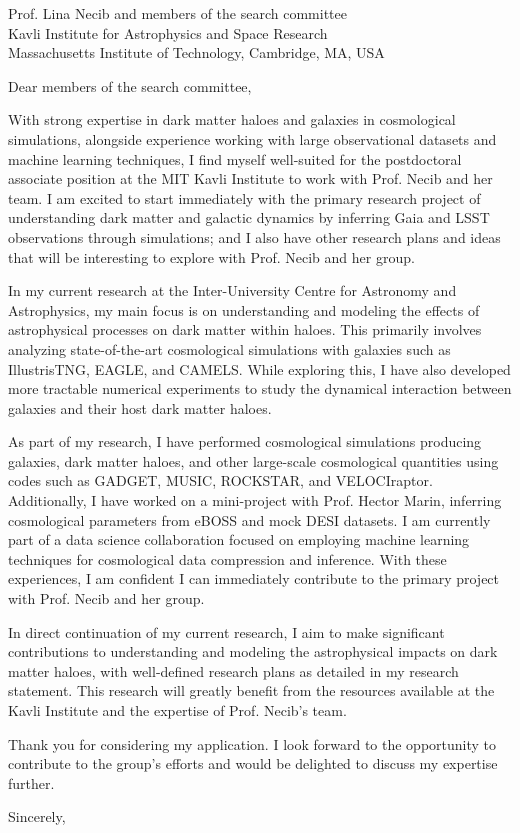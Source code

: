 \documentclass[11pt]{letter}
\begin{document}
\begin{letter}{Prof. Lina Necib and members of the search committee \\ Kavli Institute for Astrophysics and Space Research \\ Massachusetts Institute of Technology, Cambridge, MA, USA}

\opening{Dear members of the search committee,}


With strong expertise in dark matter haloes and galaxies in cosmological simulations, alongside experience working with large observational datasets and machine learning techniques, I find myself well-suited for the postdoctoral associate position at the MIT Kavli Institute to work with Prof. Necib and her team. I am excited to start immediately with the primary research project of understanding dark matter and galactic dynamics by inferring Gaia and LSST observations through simulations; and I also have other research plans and ideas that will be interesting to explore with Prof. Necib and her group.

In my current research at the Inter-University Centre for Astronomy and Astrophysics, my main focus is on understanding and modeling the effects of astrophysical processes on dark matter within haloes. This primarily involves analyzing state-of-the-art cosmological simulations with galaxies such as IllustrisTNG, EAGLE, and CAMELS. While exploring this, I have also developed more tractable numerical experiments to study the dynamical interaction between galaxies and their host dark matter haloes. 

As part of my research, I have performed cosmological simulations producing galaxies, dark matter haloes, and other large-scale cosmological quantities using codes such as GADGET, MUSIC, ROCKSTAR, and VELOCIraptor. Additionally, I have worked on a mini-project with Prof. Hector Marin, inferring cosmological parameters from eBOSS and mock DESI datasets. I am currently part of a data science collaboration focused on employing machine learning techniques for cosmological data compression and inference. With these experiences, I am confident I can immediately contribute to the primary project with Prof. Necib and her group.

In direct continuation of my current research, I aim to make significant contributions to understanding and modeling the astrophysical impacts on dark matter haloes, with well-defined research plans as detailed in my research statement. This research will greatly benefit from the resources available at the Kavli Institute and the expertise of Prof. Necib's team.

Thank you for considering my application. I look forward to the opportunity to contribute to the group's efforts and would be delighted to discuss my expertise further.

\closing{Sincerely,}

\end{letter}
\end{document}
